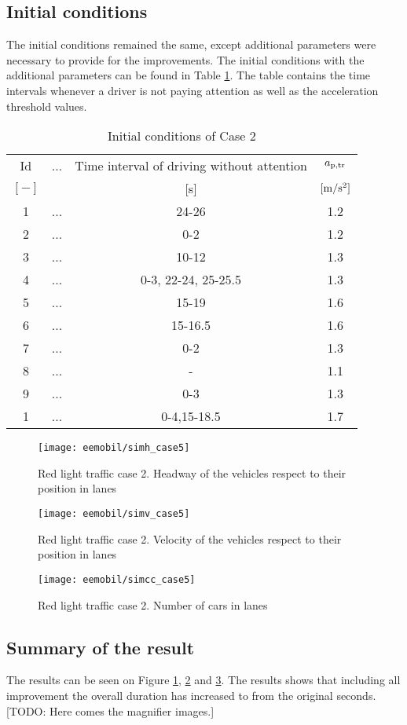 		\subsection*{Initial conditions}
		The initial conditions remained the same, except additional parameters were necessary to provide for the improvements. The initial conditions with the additional parameters can be found in Table \ref{tab:new_array}. The table contains the time intervals whenever a driver is not paying attention as well as the acceleration threshold values.
		\begin{table}[ht]
			\begin{center}
				\begin{tabular}{ |c|c|c|c| }
					\hline
					Id & ... & Time interval of driving without attention & $a_{\rm p,tr}$\\
					$[-]$ & & [s]& $\rm [m/s^2]$\\
					\hline
					1 & ... & 24-26 & 1.2 \\
					2 & ... & 0-2 & 1.2 \\
					3 & ... & 10-12 & 1.3 \\
					4 & ... & 0-3, 22-24, 25-25.5 & 1.3 \\
					5 & ... & 15-19 & 1.6 \\
					6 & ... & 15-16.5 & 1.6 \\
					7 & ... & 0-2 & 1.3 \\
					8 & ... & - & 1.1 \\
					9 & ... & 0-3 & 1.3 \\
					1 & ... & 0-4,15-18.5 & 1.7 \\
					\hline
				\end{tabular}
			\end{center}
			\caption{Initial conditions of Case 2}
			\label{tab:new_array}
		\end{table}
		\begin{figure}
			\centering
			\texttt{[image: eemobil/simh\_case5]}
			\caption{Red light traffic case 2. Headway of the vehicles respect to their position in lanes}
			\label{fig:red_light_situationh2}
		\end{figure}
		\begin{figure}
			\centering
			\texttt{[image: eemobil/simv\_case5]}
			\caption{Red light traffic case 2. Velocity of the vehicles respect to their position in lanes}
			\label{fig:red_light_situationv2}
		\end{figure}
		\begin{figure}
			\centering
			\texttt{[image: eemobil/simcc\_case5]}
			\caption{Red light traffic case 2. Number of cars in lanes }
			\label{fig:red_light_situationcc2}
		\end{figure}
		\subsection*{Summary of the result}
		The results can be seen on Figure \ref{fig:red_light_situationh2}, \ref{fig:red_light_situationv2} and \ref{fig:red_light_situationcc2}. The results shows that including all improvement the overall duration has increased to from the original seconds.
		[TODO: Here comes the magnifier images.]
